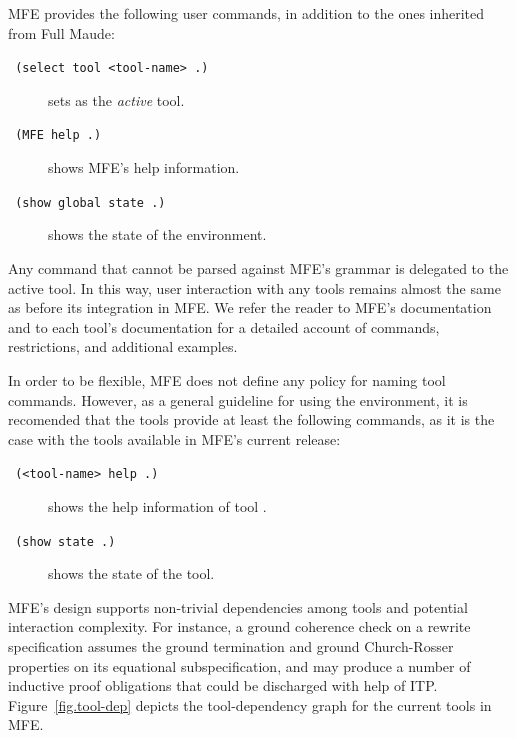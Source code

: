 \documentclass{llncs}
\begin{document}
MFE provides the following user commands, in addition to the ones inherited from Full Maude:

\begin{description}
\item[\texttt{  \small(select tool <tool-name> .)}]
sets \texttt{} as the {\em active} tool.
\item[\texttt{  \small(MFE help .)}] 
shows MFE's help information.
\item[\texttt{  \small(show global state .)}] 
shows the state of the environment.
\end{description}

Any command that cannot be parsed against MFE's grammar is delegated
to the active tool. In this way, user interaction with any
tools remains almost the same as before its integration in MFE.
We refer the reader to MFE's documentation and to each tool's documentation
for a detailed account of commands, restrictions, and additional examples. 

In order to be flexible,
MFE does not define any policy for naming tool commands.
However, as a general guideline for using the environment, 
it is recomended that the tools provide at least the following
commands, as it is the case with the tools available
in MFE's  current release:

\begin{description}
\item[\texttt{  \small(<tool-name> help .)}]
shows the help information of tool \texttt{}.
\item[\texttt{  \small(show state .)}]
shows the state of the tool.
\end{description}

MFE's design supports non-trivial dependencies
among tools and potential interaction complexity.
For instance, a ground coherence check on a rewrite specification
assumes the ground termination and ground Church-Rosser properties
on its equational subspecification, and may produce a number of inductive
proof obligations that could be discharged with help of ITP.
Figure~\ref{fig.tool-dep} depicts the tool-dependency graph for
the current tools in MFE.

\end{document}
